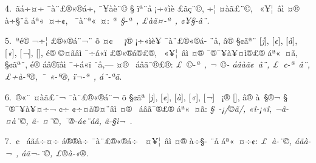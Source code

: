 \documentclass[12pt,twoside,a4paper]{article}
\begin{document}
4.~^^91^^e3^^e1^^f7^^a4^^ad^^f7 ^^af^^e0^^a8^^a3^^ae^^ab^^ae^^e1^^ad^^f7, ^^af^^a5^^e0^^e8^^a8^^a9 ^^a7 ^^ef^^aa^^a8^^e5 ^^a1^^f7^^ab^^ec^^e8 ^^a3^^e3^^e7^^ad^^a8^^a9,\linebreak
^^ad^^f7^^a6 ^^a4^^e0^^e3^^a3^^a8^^a9, ^^ad^^a0^^ab^^a5^^a6^^a0^^e2^^ec ^^a4^^ae ^^e0^^f7^^a7^^ad^^a8^^e5 ^^e1^^aa^^ab^^a0^^a4^^f7^^a2, ^^ad^^a0^^af^^e0^^a8^^aa^^ab^^a0^^a4:\linebreak
\emph{^^aa^^a0^^a7-^^aa^^a0, ^^a3^^e0^^e3^^a4-^^aa^^a0, ^^a2^^a5^^a7-^^e2^^a8.}

5.~^^9f^^aa^^e9^^ae ^^ac^^f7^^a6 ^^a3^^ae^^ab^^ae^^e1^^ad^^a8^^ac^^a8 ^^f5 ^^a4^^a2^^a0 ^^a0^^a1^^ae ^^a1^^f7^^ab^^ec^^e8^^a5 ^^af^^e0^^a8^^a3^^ae^^ab^^ae^^e1-\linebreak
^^ad^^a8^^e5, ^^e2^^ae ^^a7^^a2^^e3^^aa^^a8 [\emph{j}], [\emph{^^a2}], [\emph{^^e0}], 
[\emph{^^ab}], [\emph{^^ac}], [\emph{^^ad}], ^^e9^^ae ^^a9^^a4^^e3^^e2^^ec ^^af^^f7^^e1^^ab^^ef\linebreak
^^a3^^ae^^ab^^ae^^e1^^ad^^ae^^a3^^ae, ^^ad^^a0^^ab^^a5^^a6^^a0^^e2^^ec ^^a4^^ae ^^af^^ae^^af^^a5^^e0^^a5^^a4^^ad^^ec^^ae^^a3^^ae ^^e1^^aa^^ab^^a0^^a4^^e3, ^^a0 ^^a7^^a2^^e3^^aa^^a8,\linebreak
^^e9^^ae ^^e1^^e2^^ae^^ef^^e2^^ec ^^af^^f7^^e1^^ab^^ef ^^ad^^a8^^e5,--- ^^a4^^ae ^^ad^^a0^^e1^^e2^^e3^^af^^ad^^ae^^a3^^ae: \emph{^^a3^^a0^^a9-^^aa^^a0, ^^ac^^a0^^a9-\linebreak
^^e1^^e2^^e0^^e3^^a2^^a0^^e2^^a8, ^^a3^^a0^^a2-^^aa^^a0^^e2^^a8, ^^a3^^f7^^e0-^^aa^^ae, ^^af^^a0^^ab-^^aa^^ae, ^^ef^^ac-^^aa^^a0, ^^e1^^a8^^ad-^^aa^^e3.}


6.~^^8a^^ae^^ab^^a8 ^^a4^^e0^^e3^^a3^^a8^^ac ^^af^^e0^^a8^^a3^^ae^^ab^^ae^^e1^^ad^^a8^^ac ^^f5 ^^a7^^a2^^e3^^aa [\emph{j}], [\emph{^^a2}], [\emph{^^e0}],\linebreak{} 
[\emph{^^ab}], [\emph{^^ac}] ^^a0^^a1^^ae [\emph{^^ad}], ^^e2^^ae ^^e0^^a0^^a7^^ae^^ac ^^a7 ^^af^^ae^^af^^a5^^e0^^a5^^a4^^ad^^f7^^ac ^^a2^^f7^^ad ^^a2^^f7^^a4^^e5^^ae^^a4^^a8^^e2^^ec\linebreak\eject\noindent 
^^a4^^ae ^^ad^^a0^^e1^^e2^^e3^^af^^ad^^ae^^a3^^ae ^^e1^^aa^^ab^^a0^^a4^^e3: \emph{^^a7^^a0-^^a1/^^a9^^e3/, ^^ab^^ee-^^a1^^ab^^ee, ^^ac^^e3-^^a4^^e0^^a8^^a9, ^^ad^^e3-\linebreak
^^a4^^ad^^a8^^a9, ^^af^^ae-^^e1^^a2^^a8^^e1^^e2, ^^8a^^e3-^^a7^^ec^^ac^^a0.}


7.~^^84^^a2^^a0 ^^e1^^e3^^e1^^f7^^a4^^ad^^f7 ^^e1^^ae^^ad^^ae^^e0^^ad^^f7 ^^af^^e0^^a8^^a3^^ae^^ab^^ae^^e1^^ad^^f7 ^^ad^^a0^^a4^^a5^^a6^^a0^^e2^^ec ^^a4^^ae ^^e0^^f7^^a7-\linebreak
^^ad^^a8^^e5 ^^e1^^aa^^ab^^a0^^a4^^f7^^a2: \emph{^^a3^^a0^^e0-^^ad^^a8^^a9, ^^e1^^e3^^e0-^^ac^^a0, ^^e1^^e3^^ac-^^ad^^a8^^a9, ^^a3^^ae^^e0-^^ab^^ae.}
\end{document}
